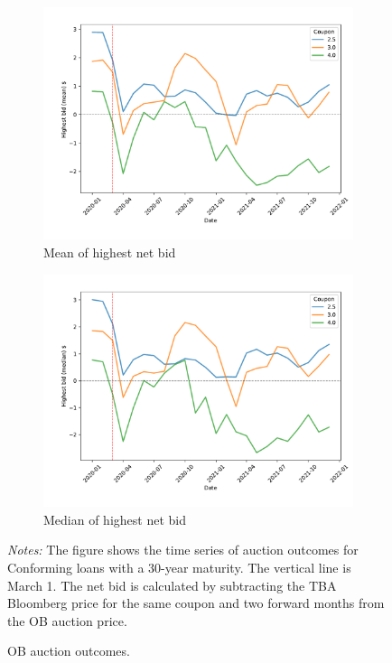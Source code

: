 \documentclass[11pt,a4paper]{article}
\begin{document}
\begin{figure}[h]
\begin{subfigure}[b]{0.49\textwidth}
      \includegraphics[width=0.998\textwidth]{../results/figures/winner_bid_mean_mat30_loan1_timeseries_cpmonthly_2.5_4__netbid.pdf}
      \caption{ Mean of highest net bid}
     \end{subfigure}
     \begin{subfigure}[b]{0.49\textwidth}
      \includegraphics[width=0.998\textwidth]{../results/figures/winner_bid_median_mat30_loan1_timeseries_cpmonthly_2.5_4__netbid.pdf}
      \caption{ Median of highest net bid}
     \end{subfigure}
   \caption{OB auction outcomes. } 
   \begin{minipage}{\textwidth}
      \footnotesize{\textit{Notes:} The figure shows the time series of auction outcomes for Conforming loans with a 30-year maturity.  The vertical line is March 1. The net bid is calculated by subtracting the TBA Bloomberg price for the same coupon and two forward months from the OB auction price. }
      \end{minipage}
\end{figure}
\end{document}
